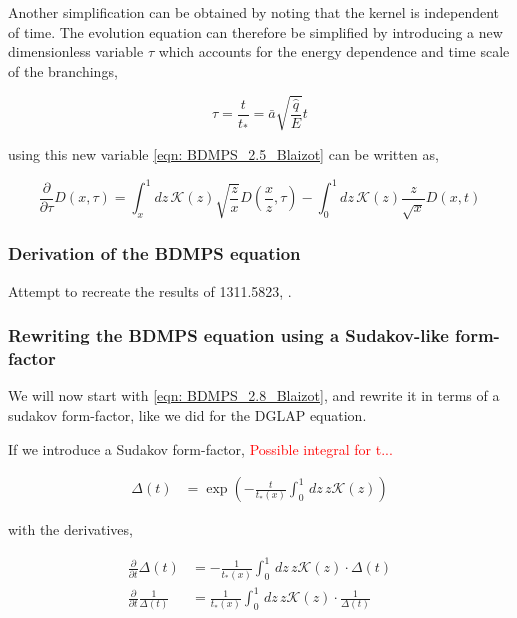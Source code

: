 \documentclass[main.tex]{subfiles}
\begin{document}
Another simplification can be obtained by noting that the kernel is independent of time. The evolution equation can therefore be simplified by introducing a new dimensionless variable \(\tau\) which accounts for the energy dependence and time scale of the branchings, 

\begin{equation}\label{eqn: medium_tau_definiton}
    \tau = \frac{t}{t_*}= \bar a \sqrt{\frac{\hat{q}}{E}} t
\end{equation}

using this new variable \autoref{eqn: BDMPS_2.5_Blaizot} can be written as, 

\begin{equation}\label{eqn: BDMPS_solution_startingpoint}
    \frac{\partial}{\partial \tau} D(x, \tau) = \int_x^1 dz \,\mathcal{K}(z) \sqrt{\frac{z}{x}} D(\frac{x}{z}, \tau) - \int_0^1 dz \,\mathcal{K}(z) \frac{z}{\sqrt{x}} D(x,t)
\end{equation}



\subsubsection{Derivation of the BDMPS equation}
Attempt to recreate the results of 1311.5823, \cite{Probabilistic_picture_for_medium-induced_jet_evolution}.

\subsubsection{Rewriting the BDMPS equation using a Sudakov-like form-factor}\label{sec: medium_sudakov}
We will now start with \autoref{eqn: BDMPS_2.8_Blaizot}, and rewrite it in terms of a sudakov form-factor, like we did for the DGLAP equation. 


If we introduce a Sudakov form-factor, \textcolor{red}{Possible integral for t...}

\begin{align}\label{eqn: BDMPS_sudakov}
    \Delta (t) &= \exp \left( -\frac{t}{t_*(x)} \int_0^1 \, dz\, z \mathcal{K}(z) \right)
\end{align}

with the derivatives, 

\begin{align}
    \frac{\partial}{\partial t} \Delta (t) &= - \frac{1}{t_*(x)} \int_0^1 \, dz\, z \mathcal{K}(z) \cdot \Delta(t) \nonumber\\
    \frac{\partial}{\partial t} \frac{1}{\Delta (t)} &= \frac{1}{t_*(x)} \int_0^1 \, dz\, z \mathcal{K}(z) \cdot \frac{1}{\Delta(t) }
\end{align}
\end{document}
